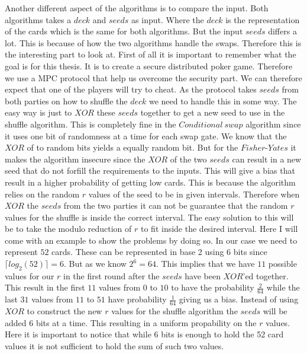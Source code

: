 \documentclass[twoside,11pt,openright]{report}
\begin{document}
Another different aspect of the algorithms is to compare the input. Both algorithms takes a $deck$ and $seeds$ as input. Where the $deck$ is the representation of the cards which is the same for both algorithms. But the input $seeds$ differs a lot. This is because of how the two algorithms handle the swaps. Therefore this is the interesting part to look at. First of all it is important to remember what the goal is for this thesis. It is to create a secure distributed poker game. Therefore we use a MPC protocol that help us overcome the security part. We can therefore expect that one of the players will try to cheat. As the protocol takes $seeds$ from both parties on how to shuffle the $deck$ we need to handle this in some way. The easy way is just to $XOR$ these $seeds$ together to get a new seed to use in the shuffle algorithm. This is completely fine in the $Conditional~swap$ algorithm since it uses one bit of randomness at a time for each swap gate. We know that the $XOR$ of to random bits yields a equally random bit. But for the $Fisher\text{-}Yates$ it makes the algorithm insecure since the $XOR$ of the two $seeds$ can result in a new seed that do not forfill the requirements to the inputs. This will give a bias that result in a higher probability of getting low cards. This is because the algorithm relies on the random $r$ values of the seed to be in given intervals. Therefore when $XOR$ the $seeds$ from the two parties it can not be guarantee that the random $r$ values for the shuffle is inside the correct interval. The easy solution to this will be to take the modulo reduction of $r$ to fit inside the desired interval. Here I will come with an example to show the problems by doing so. In our case we need to represent $52$ cards. These can be represented in base 2 using 6 bits since $\lceil{log_2(52)}\rceil=6$. But as we know $2^6=64$. This implies that we have $11$ possible values for our $r$ in the first round after the $seeds$ have been $XOR$'ed together. This result in the first $11$ values from $0$ to $10$ to have the probability $\frac{2}{64}$ while the last $31$ values from $11$ to $51$ have probability $\frac{1}{64}$ giving us a bias. 
Instead of using $XOR$ to construct the new $r$ values for the shuffle algorithm the $seeds$ will be added $6$ bits at a time. This resulting in a uniform propability on the $r$ values. Here it is important to notice that while $6$ bits is enough to hold the 52 card values it is not sufficient to hold the sum of such two values.

\bigskip
\end{document}
